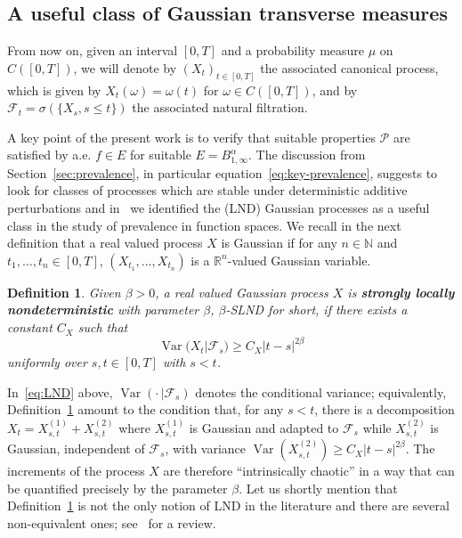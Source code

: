 \documentclass[11pt,oneside,reqno]{amsart}
\newcommand{\tmdfn}[1]{\textbf{#1}}
\newcommand{\tmop}[1]{\ensuremath{\operatorname{#1}}}
\newcommand{\tmtextit}[1]{\text{{\itshape{#1}}}}
\newtheorem{definition}[theorem]{Definition}
\numberwithin{equation}{section}
\begin{document}
\subsection{A useful class of Gaussian transverse measures}\label{sec:fbm}

From now on, given an interval $[0, T]$ and a probability measure $\mu$ on $C
([0, T])$, we will denote by $(X_t)_{t \in [0, T]}$ the associated canonical
process, which is given by $X_t (\omega) = \omega (t)$ for $\omega \in C ([0,
T])$, and by $\mathcal{F}_t = \sigma (\{ X_s, s \leqslant t \})$ the
associated natural filtration.

A key point of the present work is to verify that suitable properties
$\mathcal{P}$ are satisfied by a.e. $f \in E$ for suitable $E = B^{\alpha}_{1,
\infty}$. The discussion from Section~\ref{sec:prevalence}, in particular
equation~\eqref{eq:key-prevalence}, suggests to look for classes of processes
which are stable under deterministic additive perturbations and
in~{\cite{galeati2020prevalence}} we identified the \tmtextit{local
nondeterministic} (LND) Gaussian processes as a useful class in the study of
prevalence in function spaces. We recall in the next definition that a real
valued process $X$ is Gaussian if for any $n \in \mathbb{N}$ and $t_1, \ldots,
t_n \in [0, T]$, $(X_{t_1}, \ldots, X_{t_n})$ is a $\mathbb{R}^n$-valued
Gaussian variable.

\begin{definition}
  \label{def:LND}Given $\beta > 0$, a real valued Gaussian process $X$ is
  {\tmdfn{strongly locally nondeterministic}} with parameter $\beta$,
  $\beta$-SLND for short, if there exists a constant $C_X$ such that
  \begin{equation}
    \tmop{Var} (X_t | \mathcal{F}_s) \geqslant C_X | t - s |^{2 \beta}
    \label{eq:LND}
  \end{equation}
  uniformly over $s, t \in [0, T]$ with $s < t$.
\end{definition}

In~\eqref{eq:LND} above, $\tmop{Var} \left( \cdot \, | \mathcal{F}_s \right)$
denotes the conditional variance; equivalently, Definition~\ref{def:LND}
amount to the condition that, for any $s < t$, there is a decomposition $X_t =
X^{(1)}_{s, t} + X^{(2)}_{s, t}$ where $X^{(1)}_{s, t}$ is Gaussian and
adapted to $\mathcal{F}_s$ while $X^{(2)}_{s, t}$ is Gaussian, independent of
$\mathcal{F}_s$, with variance $\tmop{Var} (X^{(2)}_{s, t}) \geqslant C_X  | t
- s |^{2 \beta}$. The increments of the process $X$ are therefore
``intrinsically chaotic'' in a way that can be quantified precisely by the
parameter $\beta$. Let us shortly mention that Definition~\ref{def:LND} is not
the only notion of LND in the literature and there are several non-equivalent
ones; see~{\cite{xiao}} for a review.
\end{document}
